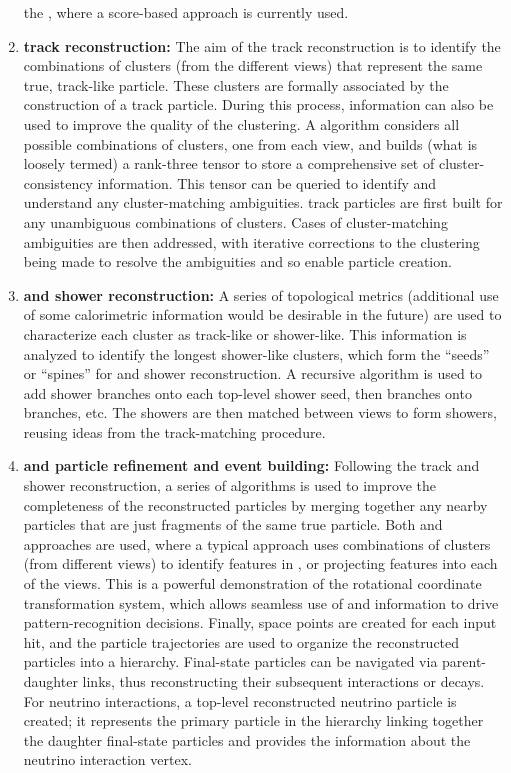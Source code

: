\begin{enumerate}
the , where a score-based approach is currently used.
\item{\bf \threed track reconstruction:} The aim of the \threed track reconstruction is to identify the combinations of \twod clusters (from the different views) that represent the same true, track-like particle. These \twod clusters are formally associated by the construction of a \threed track particle. During this process, \threed information can also be used to improve the quality of the \twod clustering. A  algorithm considers all possible combinations of \twod clusters, one from each view, and builds (what is loosely termed) a rank-three tensor to store a comprehensive set of cluster-consistency information. This tensor can be queried to identify and understand any cluster-matching ambiguities. \threed track particles are first built for any unambiguous combinations of \twod clusters. Cases of cluster-matching ambiguities are then addressed, with iterative corrections to the \twod clustering being made to resolve the ambiguities and so enable \threed particle creation.
\item{\bf \twod and \threed shower reconstruction:} A series of topological metrics (additional use of some calorimetric information would be desirable in the future) are used to characterize each \twod cluster as track-like or shower-like. This information is analyzed to identify the longest shower-like clusters, which form the ``seeds'' or ``spines'' for \twod and \threed shower reconstruction. A recursive algorithm is used to add shower branches onto each top-level shower seed, then branches onto branches, etc. The \twod showers are then matched between views to form \threed showers, reusing ideas from the \threed track-matching procedure.
\item{\bf \twod and \threed particle refinement and event building:} Following the \threed track and shower reconstruction, a series of algorithms is used to improve the completeness of the reconstructed particles by merging together any nearby particles that are just fragments of the same true particle. Both \twod and \threed approaches are used, %
where a typical approach uses combinations of \twod clusters (from different views) to identify features in \threed, or projecting \threed features into each of the \twod views. This is a powerful demonstration of the  rotational coordinate transformation system, which allows seamless use of \twod and \threed information to drive pattern-recognition decisions. Finally, \threed space points are created for each \twod input hit, and the \threed particle trajectories are used to organize the reconstructed particles into a hierarchy. Final-state particles can be navigated via parent-daughter links, thus reconstructing their subsequent interactions or decays. For neutrino interactions, a top-level reconstructed neutrino particle is created; it represents the primary particle in the hierarchy linking together the daughter final-state particles and provides the information about the neutrino interaction vertex.

\end{enumerate}

